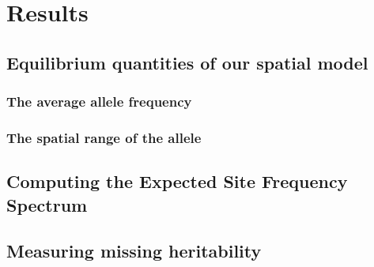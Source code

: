 \chapter{Results}
\section{Equilibrium quantities of our spatial model}
\subsection{The average allele frequency}

\subsection{The spatial range of the allele}

\section{Computing the Expected Site Frequency Spectrum}

\section{Measuring missing heritability}